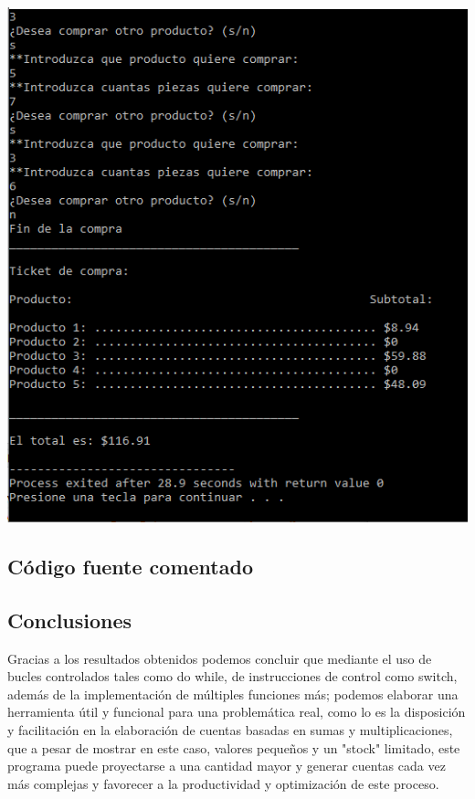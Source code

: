 \documentclass{article}
\begin{document}
\begin{center} 
	\includegraphics[scale=0.4]{Images/Paso4(2).PNG}
	\label{figura3h}
\end{center}


\begin{center}
\section{Código fuente comentado}
\end{center}



\newpage

\begin{center}
\section{Conclusiones}
\end{center}

Gracias a los resultados obtenidos podemos concluir que mediante el uso de bucles controlados tales como do while, de instrucciones de control como switch, además de la implementación de múltiples funciones más; podemos elaborar una herramienta útil y funcional para una problemática real, como lo es la disposición y facilitación en la elaboración de cuentas basadas en sumas y multiplicaciones, que a pesar de mostrar en este caso, valores pequeños y un "stock" limitado, este programa puede proyectarse a una cantidad mayor y generar cuentas cada vez más complejas y favorecer a la productividad y optimización de este proceso.
\end{document}
